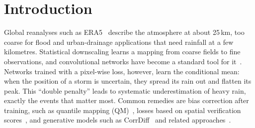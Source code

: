 \documentclass[sigconf]{acmart}
\begin{document}


\maketitle

\section{Introduction}

Global reanalyses such as ERA5~\cite{hersbach2020era5} describe the
atmosphere at about 25\,km, too coarse for flood and urban-drainage
applications that need rainfall at a few kilometres. Statistical
downscaling learns a mapping from coarse fields to fine observations, and
convolutional networks have become a standard tool for
it~\cite{vandal2017deepsd,banomedina2020,rampal2024review,harder2023constrained}. Networks trained with a
pixel-wise loss, however, learn the conditional mean: when the position of
a storm is uncertain, they spread its rain out and flatten its peak. This
``double penalty'' leads to systematic underestimation of heavy rain,
exactly the events that matter most. Common remedies are bias correction
after training, such as quantile mapping (QM)~\cite{gudmundsson2012qm},
losses based on spatial verification
scores~\cite{lagerquist2022spatial}, and generative models such as
CorrDiff~\cite{mardani2025corrdiff} and related
approaches~\cite{price2022increasing,hess2025consistency,lopezgomez2025dynamical}.
\end{document}
